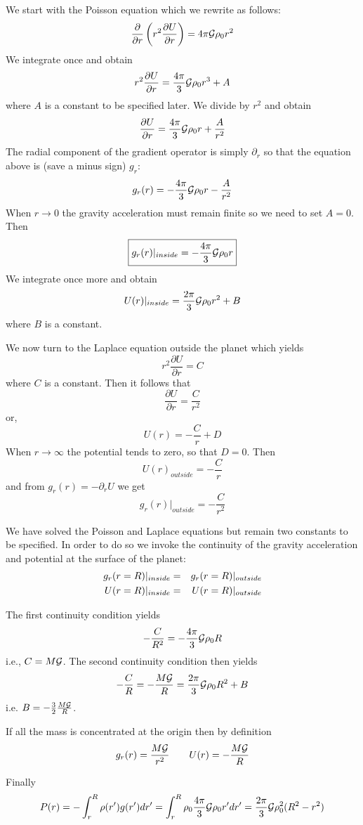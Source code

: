 We start with the Poisson equation which we rewrite as follows:
\[
\frac{\partial }{\partial r}\left( r^2 \frac{\partial U}{\partial r}\right)
= 4 \pi {\cal G} \rho_0 r^2 
\]
We integrate once and obtain
\[
r^2 \frac{\partial U}{\partial r}
= \frac{4 \pi}{3} {\cal G} \rho_0 r^3 + A 
\]
where $A$ is a constant to be specified later. We divide by $r^2$ and obtain 
\[
\frac{\partial U}{\partial r}
= \frac{4 \pi}{3} {\cal G} \rho_0 r + \frac{A}{r^2}
\]
The radial component of the gradient operator is simply $\partial_r$ so that the equation 
above is (save a minus sign) $g_r$:
\[
g_r(r) = - \frac{4 \pi}{3} {\cal G} \rho_0 r - \frac{A}{r^2}
\]
When $r\rightarrow 0$ the gravity acceleration must remain finite so we need to set $A=0$. Then 
\[
\boxed{
g_r(r)|_{inside} = - \frac{4 \pi}{3} {\cal G} \rho_0 r 
}
\]
We integrate once more and obtain 
\[
U(r)|_{inside} = \frac{2\pi}{3}{\cal G} \rho_0 r^2 + B
\]
where $B$ is a constant.

We now turn to the Laplace equation outside the planet which yields
\[
r^2 \frac{\partial U}{\partial r}  = C 
\]
where $C$ is a constant. Then it follows that 
\[
\frac{\partial U}{\partial r}  = \frac{C}{r^2} 
\]
or, 
\[
U(r) = -\frac{C}{r} + D
\]
When $r \rightarrow \infty$ the potential tends to zero, so that $D=0$. 
Then 
\[
\boxed{
U(r)_{outside} = -\frac{C}{r}
}
\]
and from $g_r(r)=-\partial_r U$ we get
\[
g_r(r)|_{outside} = -\frac{C}{r^2}
\]

We have solved the Poisson and Laplace equations but remain two constants to be specified. 
In order to do so we invoke the continuity of the gravity acceleration and potential at the 
surface of the planet:
\begin{eqnarray}
g_r(r=R)|_{inside}&=&g_r(r=R)|_{outside} \nonumber\\
U(r=R)|_{inside}&=&U(r=R)|_{outside} \nonumber
\end{eqnarray}

The first continuity condition yields
\[
-\frac{C}{R^2} = -\frac{4\pi}{3} {\cal G} \rho_0 R
\]
i.e., $C = M {\cal G}$. 
The second continuity condition then yields
\[
-\frac{C}{R} = -\frac{M {\cal G}}{R} = 
\frac{2\pi}{3}{\cal G} \rho_0 R^2 + B
\]
i.e. $B = -\frac32 \frac{M {\cal G}}{R}$.

If all the mass is concentrated at the origin then by definition
\[
g_r(r) = \frac{M {\cal G}}{r^2} 
\qquad
U(r) = -\frac{M {\cal G}}{R} 
\]

Finally
\[
P(r) = -\int_r^R \rho(r') g(r') dr' = \int_r^R \rho_0 \frac{4\pi}{3} {\cal G} \rho_0 r' dr' 
= \frac{2 \pi}{3} {\cal G} \rho_0^2 (R^2-r^2)
\]

